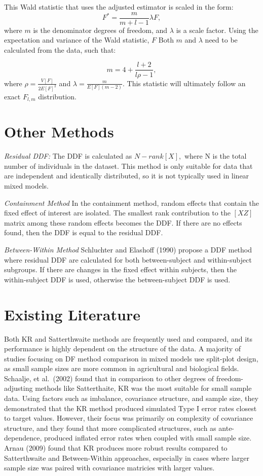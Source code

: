 \documentclass[12pt, twoside]{amherstthesis}
\begin{document}
This Wald statistic that uses the adjusted estimator is scaled in the form: \[F^* = \frac{m}{m+l-1}\lambda F,\] where \(m\) is the denominator degrees of freedom, and \(\lambda\) is a scale factor. Using the expectation and variance of the Wald statistic, \(F\) Both \(m\) and \(\lambda\) need to be calculated from the data, such that:

\[m = 4 + \frac{l+2}{l\rho-1},\] where \(\rho = \frac{V[F]}{2E[F]^2}\) and
\(\lambda = \frac{m}{E[F](m-2)}.\) This statistic will ultimately follow an exact \(F_{l,m}\) distribution.

\hypertarget{other-methods}{%
\section{Other Methods}\label{other-methods}}

\emph{Residual DDF:} The DDF is calculated as \(N-rank[X],\) where N is the total number of individuals in the dataset. This method is only suitable for data that are independent and identically distributed, so it is not typically used in linear mixed models.

\emph{Containment Method}
In the containment method, random effects that contain the fixed effect of interest are isolated. The smallest rank contribution to the \([X Z]\) matrix among these random effects becomes the DDF. If there are no effects found, then the DDF is equal to the residual DDF.

\emph{Between-Within Method}
Schluchter and Elashoff (1990) propose a DDF method where residual DDF are calculated for both between-subject and within-subject subgroups. If there are changes in the fixed effect within subjects, then the within-subject DDF is used, otherwise the between-subject DDF is used.

\hypertarget{existing-literature}{%
\section{Existing Literature}\label{existing-literature}}

Both KR and Satterthwaite methods are frequently used and compared, and its performance is highly dependent on the structure of the data.
A majority of studies focusing on DF method comparison in mixed models use split-plot design, as small sample sizes are more common in agricultural and biological fields. Schaalje, et al.~(2002) found that in comparison to other degrees of freedom-adjusting methods like Satterthaite, KR was the most suitable for small sample data. Using factors such as imbalance, covariance structure, and sample size, they demonstrated that the KR method produced simulated Type I error rates closest to target values. However, their focus was primarily on complexity of covariance structure, and they found that more complicated structures, such as ante-dependence, produced inflated error rates when coupled with small sample size. Arnau (2009) found that KR produces more robust results compared to Satterthwaite and Between-Within approaches, especially in cases where larger sample size was paired with covariance matricies with larger values.
\end{document}
